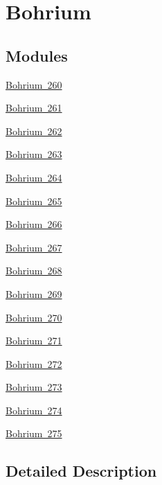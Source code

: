 \hypertarget{group___isotope_const-_bohrium}{}\section{Bohrium}
\label{group___isotope_const-_bohrium}
\subsection*{Modules}
\begin{DoxyCompactItemize}
\item 
\mbox{\hyperlink{group___isotope_const-_bohrium-_bh260}{Bohrium 260}}
\item 
\mbox{\hyperlink{group___isotope_const-_bohrium-_bh261}{Bohrium 261}}
\item 
\mbox{\hyperlink{group___isotope_const-_bohrium-_bh262}{Bohrium 262}}
\item 
\mbox{\hyperlink{group___isotope_const-_bohrium-_bh263}{Bohrium 263}}
\item 
\mbox{\hyperlink{group___isotope_const-_bohrium-_bh264}{Bohrium 264}}
\item 
\mbox{\hyperlink{group___isotope_const-_bohrium-_bh265}{Bohrium 265}}
\item 
\mbox{\hyperlink{group___isotope_const-_bohrium-_bh266}{Bohrium 266}}
\item 
\mbox{\hyperlink{group___isotope_const-_bohrium-_bh267}{Bohrium 267}}
\item 
\mbox{\hyperlink{group___isotope_const-_bohrium-_bh268}{Bohrium 268}}
\item 
\mbox{\hyperlink{group___isotope_const-_bohrium-_bh269}{Bohrium 269}}
\item 
\mbox{\hyperlink{group___isotope_const-_bohrium-_bh270}{Bohrium 270}}
\item 
\mbox{\hyperlink{group___isotope_const-_bohrium-_bh271}{Bohrium 271}}
\item 
\mbox{\hyperlink{group___isotope_const-_bohrium-_bh272}{Bohrium 272}}
\item 
\mbox{\hyperlink{group___isotope_const-_bohrium-_bh273}{Bohrium 273}}
\item 
\mbox{\hyperlink{group___isotope_const-_bohrium-_bh274}{Bohrium 274}}
\item 
\mbox{\hyperlink{group___isotope_const-_bohrium-_bh275}{Bohrium 275}}
\end{DoxyCompactItemize}


\subsection{Detailed Description}

